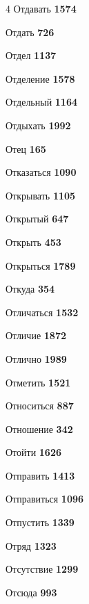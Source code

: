 \begin{multicols}{4}
\noindent Отдавать \dotfill \textbf{\color{secondary} 1574}\par
\noindent Отдать \dotfill \textbf{\color{secondary} 726}\par
\noindent Отдел \dotfill \textbf{\color{secondary} 1137}\par
\noindent Отделение \dotfill \textbf{\color{secondary} 1578}\par
\noindent Отдельный \dotfill \textbf{\color{secondary} 1164}\par
\noindent Отдыхать \dotfill \textbf{\color{secondary} 1992}\par
\noindent Отец \dotfill \textbf{\color{secondary} 165}\par
\noindent Отказаться \dotfill \textbf{\color{secondary} 1090}\par
\noindent Открывать \dotfill \textbf{\color{secondary} 1105}\par
\noindent Открытый \dotfill \textbf{\color{secondary} 647}\par
\noindent Открыть \dotfill \textbf{\color{secondary} 453}\par
\noindent Открыться \dotfill \textbf{\color{secondary} 1789}\par
\noindent Откуда \dotfill \textbf{\color{secondary} 354}\par
\noindent Отличаться \dotfill \textbf{\color{secondary} 1532}\par
\noindent Отличие \dotfill \textbf{\color{secondary} 1872}\par
\noindent Отлично \dotfill \textbf{\color{secondary} 1989}\par
\noindent Отметить \dotfill \textbf{\color{secondary} 1521}\par
\noindent Относиться \dotfill \textbf{\color{secondary} 887}\par
\noindent Отношение \dotfill \textbf{\color{secondary} 342}\par
\noindent Отойти \dotfill \textbf{\color{secondary} 1626}\par
\noindent Отправить \dotfill \textbf{\color{secondary} 1413}\par
\noindent Отправиться \dotfill \textbf{\color{secondary} 1096}\par
\noindent Отпустить \dotfill \textbf{\color{secondary} 1339}\par
\noindent Отряд \dotfill \textbf{\color{secondary} 1323}\par
\noindent Отсутствие \dotfill \textbf{\color{secondary} 1299}\par
\noindent Отсюда \dotfill \textbf{\color{secondary} 993}\par

\end{multicols}
